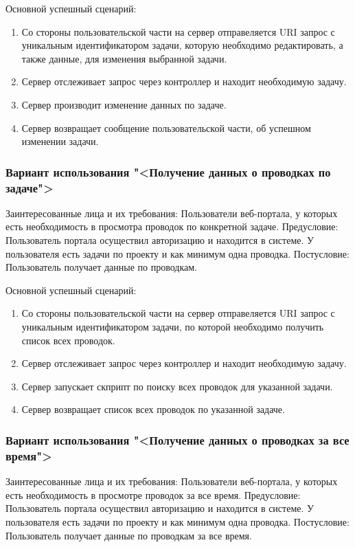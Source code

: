 Основной успешный сценарий:
\begin{enumerate}
	\item Со стороны пользовательской части на сервер отправеляется URI запрос с уникальным идентификатором задачи, которую необходимо редактировать, а также данные, для изменения выбранной задачи.
	\item Сервер отслеживает запрос через контроллер и находит необходимую задачу.
	\item Сервер производит изменение данных по задаче. 
	\item Сервер возвращает сообщение пользовательской части, об успешном изменении задачи.
\end{enumerate}

\subsubsection{Вариант использования "<Получение данных о проводках по задаче">}

Заинтересованные лица и их требования: Пользователи веб-портала, у которых есть необходимость в просмотра проводок по конкретной задаче.
Предусловие: Пользователь портала осуществил авторизацию и находится в системе. У пользователя есть задачи по проекту и как минимум одна проводка. Постусловие: Пользователь получает данные по проводкам.

Основной успешный сценарий:
\begin{enumerate}
	\item Со стороны пользовательской части на сервер отправеляется URI запрос с уникальным идентификатором задачи, по которой необходимо получить список всех проводок.
	\item Сервер отслеживает запрос через контроллер и находит необходимую задачу.
	\item Сервер запускает скприпт по поиску всех проводок для указанной задачи.
	\item Сервер возвращает список всех проводок по указанной задаче.
\end{enumerate}

\subsubsection{Вариант использования "<Получение данных о проводках за все время">}

Заинтересованные лица и их требования: Пользователи веб-портала, у которых есть необходимость в просмотре проводок за все время.
Предусловие: Пользователь портала осуществил авторизацию и находится в системе. У пользователя есть задачи по проекту и как минимум одна проводка. Постусловие: Пользователь получает данные по проводкам за все время.


